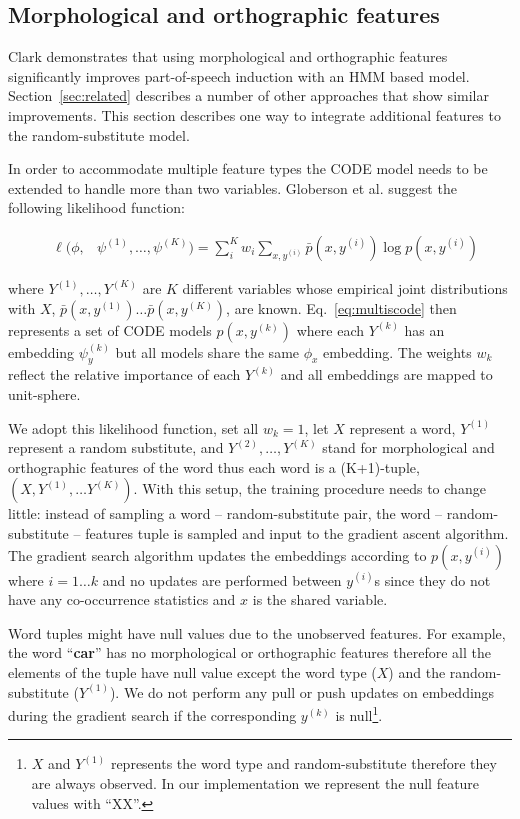 \subsection{Morphological and orthographic features}
\label{sec:feat}

Clark  demonstrates that
using morphological and orthographic features significantly improves
part-of-speech induction with an HMM based model.
Section~\ref{sec:related} describes a number of other approaches that
show similar improvements.  This section describes one way to
integrate additional features to the random-substitute model.

In order to accommodate multiple feature types the CODE model needs to
be extended to handle more than two variables.  Globerson et
al.  suggest the following
likelihood function:

\begin{eqnarray}
&\ell(\phi,& \psi^{(1)}, \ldots, \psi^{(K)}) = \label{eq:multiscode} \sum_i^K w_i \sum_{x,y^{(i)}} \bar{p}(x,y^{(i)}) \log p(x,y^{(i)})
\end{eqnarray}

\noindent where $Y^{(1)}, \ldots, Y^{(K)}$ are $K$ different variables
whose empirical joint distributions with $X$,
$\bar{p}(x,y^{(1)})\ldots\bar{p}(x,y^{(K)})$, are known.
Eq.~\ref{eq:multiscode} then represents a set of CODE models
$p(x,y^{(k)})$ where each $Y^{(k)}$ has an embedding $\psi_y^{(k)}$
but all models share the same $\phi_x$ embedding.  The weights $w_k$
reflect the relative importance of each $Y^{(k)}$ and all embeddings
are mapped to unit-sphere.

We adopt this likelihood function, set all $w_k=1$, let $X$ represent
a word, $Y^{(1)}$ represent a random substitute, and $Y^{(2)}, \ldots,
Y^{(K)}$ stand for morphological and orthographic features of the word
thus each word is a (K+1)-tuple, $(X, Y^{(1)}, \hdots Y^{(K)})$.  With
this setup, the training procedure needs to change little: instead of
sampling a word -- random-substitute pair, the word --
random-substitute -- features tuple is sampled and input to the
gradient ascent algorithm.  The gradient search algorithm updates the
embeddings according to $p(x,y^{(i)})$ where $i=1\hdots k$ and no
updates are performed between $y^{(i)}$s since they do not have any
co-occurrence statistics and $x$ is the shared variable.

Word tuples might have null values due to the unobserved features.
For example, the word ``\textbf{car}'' has no morphological or
orthographic features therefore all the elements of the tuple have
null value except the word type ($X$) and the random-substitute
($Y^{(1)}$).  We do not perform any pull or push updates on embeddings
during the gradient search if the corresponding $y^{(k)}$ is
null\footnote{$X$ and $Y^{(1)}$ represents the word type and
  random-substitute therefore they are always observed.  In our
  implementation we represent the null feature values with ``XX''.}.


